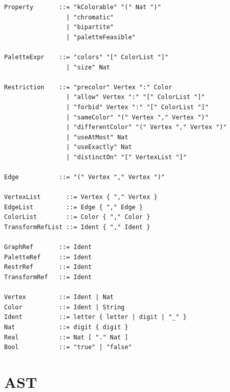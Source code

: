 \documentclass[11pt]{article}
\begin{document}
\begin{lstlisting}[style=plain]
Property       ::= "kColorable" "(" Nat ")"
                 | "chromatic"
                 | "bipartite"
                 | "paletteFeasible"

PaletteExpr    ::= "colors" "[" ColorList "]"
                 | "size" Nat

Restriction    ::= "precolor" Vertex ":" Color
                 | "allow" Vertex ":" "[" ColorList "]"
                 | "forbid" Vertex ":" "[" ColorList "]"
                 | "sameColor" "(" Vertex "," Vertex ")"
                 | "differentColor" "(" Vertex "," Vertex ")"
                 | "useAtMost" Nat
                 | "useExactly" Nat
                 | "distinctOn" "[" VertexList "]"

Edge           ::= "(" Vertex "," Vertex ")"

VertexList       ::= Vertex { "," Vertex }
EdgeList         ::= Edge { "," Edge }
ColorList        ::= Color { "," Color }
TransformRefList ::= Ident { "," Ident }

GraphRef       ::= Ident
PaletteRef     ::= Ident
RestrRef       ::= Ident
TransformRef   ::= Ident

Vertex         ::= Ident | Nat
Color          ::= Ident | String
Ident          ::= letter { letter | digit | "_" }
Nat            ::= digit { digit }
Real           ::= Nat [ "." Nat ]
Bool           ::= "true" | "false"
\end{lstlisting}

\section*{AST}
\end{document}
